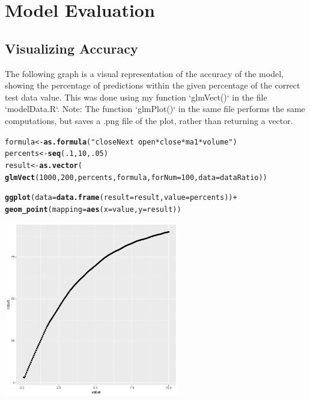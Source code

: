 \documentclass{article}\usepackage[]{graphicx}\usepackage[]{color}
\makeatletter
\newcommand{\hlnum}[1]{\textcolor[rgb]{0.686,0.059,0.569}{#1}}%
\newcommand{\hlstr}[1]{\textcolor[rgb]{0.192,0.494,0.8}{#1}}%
\newcommand{\hlopt}[1]{\textcolor[rgb]{0,0,0}{#1}}%
\newcommand{\hlstd}[1]{\textcolor[rgb]{0.345,0.345,0.345}{#1}}%
\newcommand{\hlkwb}[1]{\textcolor[rgb]{0.69,0.353,0.396}{#1}}%
\newcommand{\hlkwc}[1]{\textcolor[rgb]{0.333,0.667,0.333}{#1}}%
\newcommand{\hlkwd}[1]{\textcolor[rgb]{0.737,0.353,0.396}{\textbf{#1}}}%
\newenvironment{kframe}{%
 \def\at@end@of@kframe{}%
 \ifinner\ifhmode%
  \def\at@end@of@kframe{\end{minipage}}%
  \begin{minipage}{\columnwidth}%
 \fi\fi%
 \def\FrameCommand##1{\hskip\@totalleftmargin \hskip-\fboxsep
 \colorbox{shadecolor}{##1}\hskip-\fboxsep
     \hskip-\linewidth \hskip-\@totalleftmargin \hskip\columnwidth}%
 \MakeFramed {\advance\hsize-\width
   \@totalleftmargin\z@ \linewidth\hsize
   \@setminipage}}%
 {\par\unskip\endMakeFramed%
 \at@end@of@kframe}
\newenvironment{knitrout}{}{} %
\makeatother
\begin{document}
\section{Model Evaluation}
\subsection{Visualizing Accuracy}
The following graph is a visual representation of the accuracy of the model, showing the percentage of predictions within the given percentage of the correct test data value. This was done using my function `glmVect()` in the file `modelData.R`. Note: The function `glmPlot()` in the same file performs the same computations, but saves a .png file of the plot, rather than returning a vector.

\begin{knitrout}
\color{fgcolor}\begin{kframe}
\begin{alltt}
\hlstd{formula} \hlkwb{<-} \hlkwd{as.formula}\hlstd{(}\hlstr{"closeNext~open*close*ma1*volume"}\hlstd{)}
\hlstd{percents} \hlkwb{<-} \hlkwd{seq}\hlstd{(}\hlnum{.1}\hlstd{,}\hlnum{10}\hlstd{,}\hlnum{.05}\hlstd{)}
\hlstd{result} \hlkwb{<-} \hlkwd{as.vector}\hlstd{(}
  \hlkwd{glmVect}\hlstd{(}\hlnum{1000}\hlstd{,}\hlnum{200}\hlstd{,percents,formula,}\hlkwc{forNum}\hlstd{=}\hlnum{100}\hlstd{,}\hlkwc{data}\hlstd{=dataRatio))}
\end{alltt}
\end{kframe}
\end{knitrout}
\begin{center}
\begin{knitrout}
\color{fgcolor}\begin{kframe}
\begin{alltt}
\hlkwd{ggplot}\hlstd{(}\hlkwc{data}\hlstd{=}\hlkwd{data.frame}\hlstd{(}\hlkwc{result}\hlstd{=result,}\hlkwc{value}\hlstd{=percents))} \hlopt{+}
  \hlkwd{geom_point}\hlstd{(}\hlkwc{mapping} \hlstd{=} \hlkwd{aes}\hlstd{(}\hlkwc{x}\hlstd{=value,}\hlkwc{y}\hlstd{=result))}
\end{alltt}
\end{kframe}
\includegraphics[width=3in,height=3in]{figure/unnamed-chunk-15-1} 

\end{knitrout}
\end{center}
\end{document}
